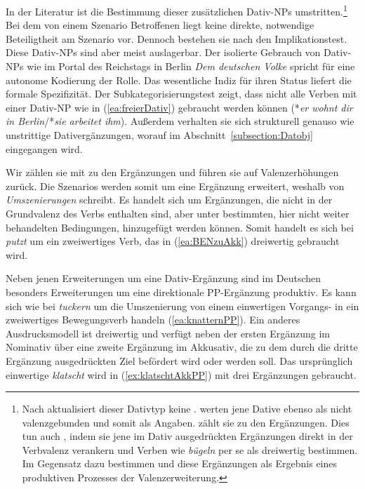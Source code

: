 In der Literatur ist die Bestimmung dieser zusätzlichen Dativ-NPs umstritten.\footnote{Nach \citet[368]{HeidolphFlaemigMotsch1981} aktualisiert dieser Dativtyp keine . \citet[263--265]{HelbigBuscha} werten jene Dative ebenso als nicht valenzgebunden und somit als Angaben. \citet[320--323]{Eisenberg2020_Satz} zählt sie zu den Ergänzungen. Dies tun auch \citet[64--65]{PittnerBerman2021}, indem sie jene im Dativ ausgedrückten Ergänzungen direkt in der Verbvalenz verankern und Verben wie \textit{bügeln} per se als dreiwertig bestimmen. Im Gegensatz dazu bestimmen \citet[72]{Welke1988} und \citet[25--26]{Jacobs1994} diese Ergänzungen als Ergebnis eines produktiven Prozesses der Valenzerweiterung.} Bei dem von einem Szenario Betroffenen liegt keine direkte, notwendige Beteiligtheit am Szenario vor. Dennoch bestehen sie nach \citet[1088]{ZifHoffStr1997} den Implikationstest. Diese Dativ-NPs sind aber meist auslagerbar. Der isolierte Gebrauch von Dativ-NPs wie im Portal des Reichstags in Berlin \textit{Dem deutschen Volke} spricht für eine autonome Kodierung der Rolle. Das wesentliche Indiz für ihren Status liefert die formale Spezifizität. Der Subkategorisierungstest zeigt, dass nicht alle Verben mit einer Dativ-NP wie in (\ref{ea:freierDativ}) gebraucht werden können (*\textit{er wohnt dir in Berlin}/*\textit{sie arbeitet ihm}). Außerdem verhalten sie sich strukturell genauso wie unstrittige Dativergänzungen, worauf im Abschnitt~\ref{subsection:Datobj} eingegangen wird.

Wir zählen sie mit \citet[144]{Wegener1985} zu den Ergänzungen und führen sie auf Valenzerhöhungen zurück. Die Szenarios werden somit um eine Ergänzung erweitert, weshalb \citet[47--50]{Agel2017} von \textit{Umszenierungen} schreibt. Es handelt sich um Ergänzungen, die nicht in der Grundvalenz des Verbs enthalten sind, aber unter bestimmten, hier nicht weiter behandelten Bedingungen, hinzugefügt werden können. Somit handelt es sich bei \textit{putzt} um ein zweiwertiges Verb, das in (\ref{ea:BENzuAkk}) dreiwertig gebraucht wird. 

Neben jenen Erweiterungen um eine Dativ-Ergänzung sind im Deutschen besonders Erweiterungen um eine direktionale PP-Ergänzung produktiv. Es kann sich wie bei \textit{tuckern} um die Umszenierung von einem einwertigen Vorgangs- in ein zweiwertiges Bewegungsverb handeln (\ref{ea:knatternPP}). Ein anderes Ausdrucksmodell ist dreiwertig und verfügt neben der ersten Ergänzung im Nominativ über eine zweite Ergänzung im Akkusativ, die zu dem durch die dritte Ergänzung ausgedrückten Ziel befördert wird oder werden soll. Das ursprünglich einwertige \textit{klatscht} wird in (\ref{ex:klatschtAkkPP}) mit drei Ergänzungen gebraucht.

